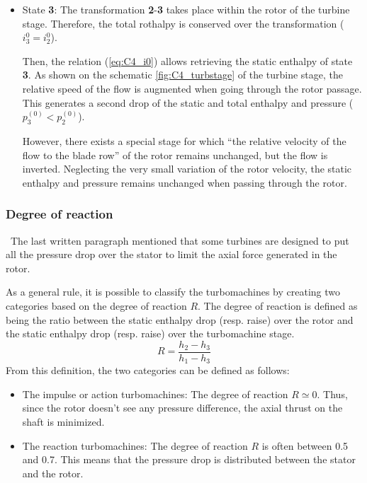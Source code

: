 \begin{itemize}
    \item State \textbf{3}: The transformation \textbf{2}-\textbf{3} takes place within the rotor of the turbine stage. Therefore, the total rothalpy is conserved over the transformation (\(i_3^0=i_2^0\)).

    Then, the relation (\ref{eq:C4_i0}) allows retrieving the static enthalpy of state \textbf{3}. As shown on the schematic \ref{fig:C4_turbstage} of the turbine stage, the relative speed of the flow is augmented when going through the rotor passage. This generates a second drop of the static and total enthalpy and pressure (\(p_3^{(0)}<p_2^{(0)}\)).

    However, there exists a special stage for which “the relative velocity of the flow to the blade row” of the rotor\cite{Hillewaert2019} remains unchanged, but the flow is inverted. Neglecting the very small variation of the rotor velocity, the static enthalpy and pressure remains unchanged when passing through the rotor.
\end{itemize}


\subsubsection{Degree of reaction}
\quad\ The last written paragraph mentioned that some turbines are designed to put all the pressure drop over the stator to limit the axial force generated in the rotor.

As a general rule, it is possible to classify the turbomachines by creating two categories based on the degree of reaction \(R\). The degree of reaction is defined as being the ratio between the static enthalpy drop (resp. raise) over the rotor and the static enthalpy drop (resp. raise) over the turbomachine stage.
\begin{equation}
    R = \frac{h_2 - h_3}{h_1 - h_3}\label{eq:C4_R}
\end{equation}
From this definition, the two categories can be defined as follows:

\begin{itemize}
    \item The impulse or action turbomachines: The degree of reaction \(R\simeq 0\). Thus, since the rotor doesn't see any pressure difference, the axial thrust on the shaft is minimized. 
    \item The reaction turbomachines: The degree of reaction \(R\) is often between 0.5 and 0.7. This means that the pressure drop is distributed between the stator and the rotor.
\end{itemize}

